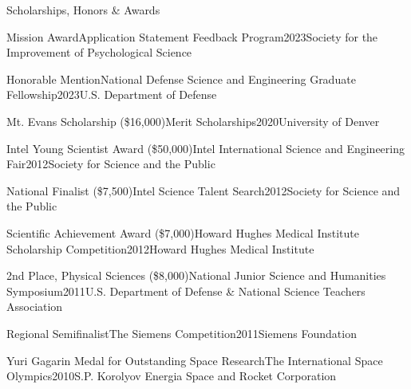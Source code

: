 \documentclass{cv} %
\begin{document}
\begin{cvSection}{Scholarships, Honors \& Awards}

\begin{cvSubsectionAwards}{Mission Award}{Application Statement Feedback Program}{2023}{Society for the Improvement of Psychological Science}
\end{cvSubsectionAwards}

\begin{cvSubsectionAwards}{Honorable Mention}{National Defense Science and Engineering Graduate Fellowship}{2023}{U.S. Department of Defense}
\end{cvSubsectionAwards}

\begin{cvSubsectionAwards}{Mt. Evans Scholarship (\$16,000)}{Merit Scholarships}{2020}{University of Denver}
\end{cvSubsectionAwards}

\begin{cvSubsectionAwards}{Intel Young Scientist Award (\$50,000)}{Intel International Science and Engineering Fair}{2012}{Society for Science and the Public}
\end{cvSubsectionAwards}

\begin{cvSubsectionAwards}{National Finalist (\$7,500)}{Intel Science Talent Search}{2012}{Society for Science and the Public}
\end{cvSubsectionAwards}

\begin{cvSubsectionAwards}{Scientific Achievement Award (\$7,000)}{Howard Hughes Medical Institute Scholarship Competition}{2012}{Howard Hughes Medical Institute}
\end{cvSubsectionAwards}

\begin{cvSubsectionAwards}{2nd Place, Physical Sciences (\$8,000)}{National Junior Science and Humanities Symposium}{2011}{U.S. Department of Defense \& National Science Teachers Association}
\end{cvSubsectionAwards}

\begin{cvSubsectionAwards}{Regional Semifinalist}{The Siemens Competition}{2011}{Siemens Foundation}
\end{cvSubsectionAwards}

\begin{cvSubsectionAwards}{Yuri Gagarin Medal for Outstanding Space Research}{The International Space Olympics}{2010}{S.P. Korolyov Energia Space and Rocket Corporation}
\end{cvSubsectionAwards}

\end{cvSection}
\end{document}

